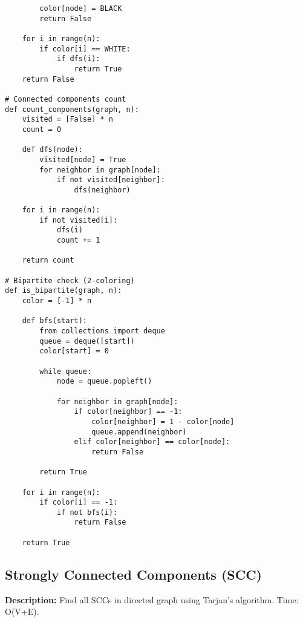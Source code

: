 \begin{lstlisting}
        color[node] = BLACK
        return False
    
    for i in range(n):
        if color[i] == WHITE:
            if dfs(i):
                return True
    return False

# Connected components count
def count_components(graph, n):
    visited = [False] * n
    count = 0
    
    def dfs(node):
        visited[node] = True
        for neighbor in graph[node]:
            if not visited[neighbor]:
                dfs(neighbor)
    
    for i in range(n):
        if not visited[i]:
            dfs(i)
            count += 1
    
    return count

# Bipartite check (2-coloring)
def is_bipartite(graph, n):
    color = [-1] * n
    
    def bfs(start):
        from collections import deque
        queue = deque([start])
        color[start] = 0
        
        while queue:
            node = queue.popleft()
            
            for neighbor in graph[node]:
                if color[neighbor] == -1:
                    color[neighbor] = 1 - color[node]
                    queue.append(neighbor)
                elif color[neighbor] == color[node]:
                    return False
        
        return True
    
    for i in range(n):
        if color[i] == -1:
            if not bfs(i):
                return False
    
    return True
\end{lstlisting}

\subsection{Strongly Connected Components (SCC)}
\textbf{Description:} Find all SCCs in directed graph using Tarjan's algorithm. Time: O(V+E).

